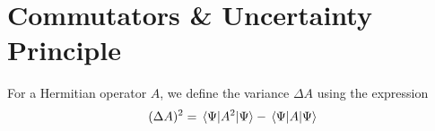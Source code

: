\chapter{Commutators \& Uncertainty Principle}
For a Hermitian operator $A$, we define the variance $\Delta A$ using
the expression
\[
(\Delta A)^2 = \expval{A^2}{\Psi} - \expval{A}{\Psi}
\]

